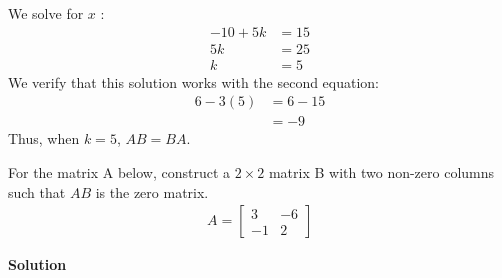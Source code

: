 \documentclass[11pt]{scrartcl}
\theoremstyle{dotlessP}
\theoremstyle{dotlessN}
\begin{document}
	We solve for $x$ : 
	\begin{align*}
		-10 + 5k &= 15 \\
		5k &= 25 \\
		k &= 5
	\end{align*}
	We verify that this solution works with the second equation:
	\begin{align*}
		6 - 3(5) &= 6 - 15 \\
				&= -9
	\end{align*}
	Thus, when $k = 5$, $AB = BA$.
\begin{ques}
	For the matrix A below, construct a $2 \times 2$ matrix B with two non-zero columns such that $AB$ is the zero matrix. 
    \begin{align*}
        A = \begin{bmatrix}
            3 & -6 \\ -1 & 2
        \end{bmatrix}
    \end{align*}
\end{ques}
\textbf{Solution}
\end{document}
